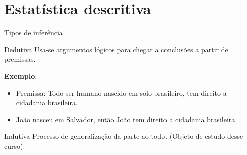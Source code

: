 \documentclass[9pt]{beamer}
\begin{document}
\section{Estatística descritiva}
\begin{frame}{Tipos de inferência}
 
 \vfill
 
 \begin{block}{Dedutiva}
  Usa-se argumentos lógicos para chegar a conclusões a partir de premissas.

  \textbf{Exemplo}: 
  \begin{itemize}
   \item Premissa: Todo ser humano nascido em solo brasileiro, tem direito a cidadania brasileira. 
   \item João nasceu em Salvador, então João tem direito a cidadania brasileira.
  \end{itemize}
 \end{block}

 \vfill
 
 \begin{block}{Indutiva}
  Processo de generalização da parte ao todo. (Objeto de estudo desse curso). 
  

\end{block}
\end{frame}
\end{document}
